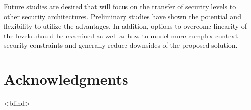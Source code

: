 \documentclass{sig-alternate}
\begin{document}
Future studies are desired that will focus on the transfer of security levels to other security architectures. Preliminary studies have shown the potential and flexibility to utilize the advantages. In addition, options to overcome linearity of the levels should be examined as well as how to model more complex context security constraints and generally reduce downsides of the proposed solution.

\section{Acknowledgments}
<blind>

%

%
%
\end{document}
